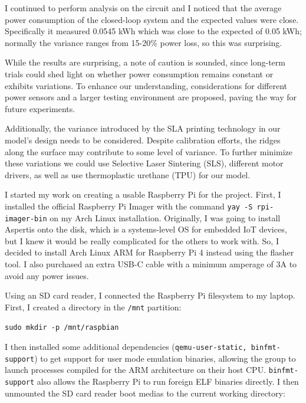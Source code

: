 \newpage


I continued to perform analysis on the circuit and I noticed that the average power consumption of the closed-loop system and the expected values were close.  Specifically it measured 0.0545 kWh which was close to the expected of 0.05 kWh; normally the variance ranges from 15-20\% power loss, so this was surprising.

While the results are surprising, a note of caution is sounded, since long-term trials could shed light on whether power consumption remains constant or exhibits variations. To enhance our understanding, considerations for different power sensors and a larger testing environment are proposed, paving the way for future experiments.

Additionally, the variance introduced by the SLA printing technology in our model's design needs to be considered. Despite calibration efforts, the ridges along the surface may contribute to some level of variance. To further minimize these variations we could use Selective Laser Sintering (SLS), different motor drivers, as well as use thermoplastic urethane (TPU) for our model.

\newpage


I started my work on creating a usable Raspberry Pi for the project. First, I installed the official Raspberry Pi Imager with the command \Verb"yay -S rpi-imager-bin" on my Arch Linux installation. Originally, I was going to install Aspertis onto the disk, which is a systems-level OS for embedded IoT devices, but I knew it would be really complicated for the others to work with. So, I decided to install Arch Linux ARM for Raspberry Pi 4 instead using the flasher tool. I also purchased an extra USB-C cable with a minimum amperage of 3A to avoid any power issues.

\newpage 


Using an SD card reader, I connected the Raspberry Pi filesystem to my laptop. First, I created a directory in the \Verb"/mnt" partition:

\Verb"sudo mkdir -p /mnt/raspbian"

I then installed some additional dependencies (\Verb"qemu-user-static, binfmt-support") to get support for user mode emulation binaries, allowing the group to launch processes compiled for the ARM architecture on their host CPU. \Verb"binfmt-support" also allows the Raspberry Pi to run foreign ELF binaries directly. I then unmounted the SD card reader boot medias to the current working directory:

